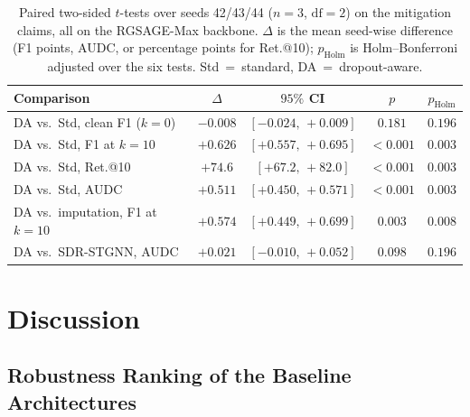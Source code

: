 \documentclass[3p,times,procedia]{elsarticle}
\begin{document}
\begin{table}[!tb]
  \centering
  \caption{Paired two-sided $t$-tests over seeds 42/43/44 ($n=3$, $\mathrm{df}=2$)
           on the mitigation claims, all on the RGSAGE-Max backbone. $\Delta$ is the
           mean seed-wise difference (F1 points, AUDC, or percentage points for
           Ret.@10); $p_{\text{Holm}}$ is Holm--Bonferroni adjusted over the six
           tests. Std\ =\ standard, DA\ =\ dropout-aware.}
  \label{tab:significance}
  \scriptsize
  \setlength{\tabcolsep}{3pt}
  \begin{tabular}{@{}lcccc@{}}
    \toprule
    Comparison & $\Delta$ & $95\%$ CI & $p$ & $p_{\text{Holm}}$ \\
    \midrule
    DA vs.\ Std, clean F1 ($k{=}0$) & $-0.008$ & $[-0.024,\,+0.009]$ & $0.181$ & $0.196$ \\
    DA vs.\ Std, F1 at $k{=}10$ & $+0.626$ & $[+0.557,\,+0.695]$ & $<\!0.001$ & $0.003$ \\
    DA vs.\ Std, Ret.@10 & $+74.6$ & $[+67.2,\,+82.0]$ & $<\!0.001$ & $0.003$ \\
    DA vs.\ Std, AUDC & $+0.511$ & $[+0.450,\,+0.571]$ & $<\!0.001$ & $0.003$ \\
    DA vs.\ imputation, F1 at $k{=}10$ & $+0.574$ & $[+0.449,\,+0.699]$ & $0.003$ & $0.008$ \\
    DA vs.\ SDR-STGNN, AUDC & $+0.021$ & $[-0.010,\,+0.052]$ & $0.098$ & $0.196$ \\
    \bottomrule
  \end{tabular}
\end{table}


\section{Discussion}
\label{sec:discussion}

\subsection{Robustness Ranking of the Baseline Architectures}
\end{document}
